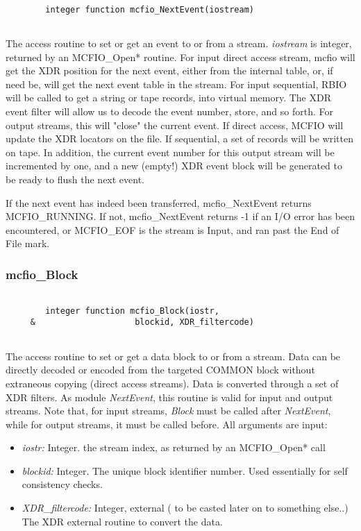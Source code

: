 \begin{verbatim}

        integer function mcfio_NextEvent(iostream)
	
\end{verbatim}
The access routine to set or get an event to or from a  stream. {\em iostream}
is integer, returned by an MCFIO\_Open* routine.  For input direct access stream,
mcfio will get the XDR position  for the next event, either from the internal
table, or, if  need be, will get the next event table in the stream.  For input
sequential, RBIO will be called to get a string  or tape records, into virtual
memory. The XDR event filter will allow us to decode the event number, store,
and so forth. For output streams, this will "close" the current event.  If 
direct access, MCFIO will update the XDR locators on the file. If sequential, a
set of records will be written on tape.  In addition, the current event number
for this output stream will  be incremented by one, and a new (empty!) XDR
event block will be  generated to be ready to flush the next event.

	If the next event has indeed been transferred, mcfio\_NextEvent returns 
MCFIO\_RUNNING.  If not, mcfio\_NextEvent returns -1 if an I/O error has 
been encountered, or MCFIO\_EOF is the stream is Input, and ran past the 
End of File mark. 
	
\subsubsection{mcfio\_Block}

\begin{verbatim}

        integer function mcfio_Block(iostr,
     &                    blockid, XDR_filtercode)
     
\end{verbatim}
The access routine to set or get a data  block to or from a  stream. Data can
be directly decoded or encoded from the targeted  COMMON block without
extraneous copying (direct access streams). Data is converted through a set of
XDR filters.  As module {\em NextEvent}, this routine is valid  for input and
output streams. Note that, for input streams, {\em Block} must be called after
{\em NextEvent}, while for output streams, it must be called before. All
arguments are input:

\begin{itemize} 
\item {\em iostr:} Integer. the stream index, as returned by an MCFIO\_Open* 
call
\item{\em blockid:} Integer. The unique block identifier number. Used 
essentially for self consistency checks. 
\item{\em XDR\_filtercode:} Integer, external
 ( to be casted later on to something else..)
  The XDR external routine to convert the data. 
\end{itemize}


